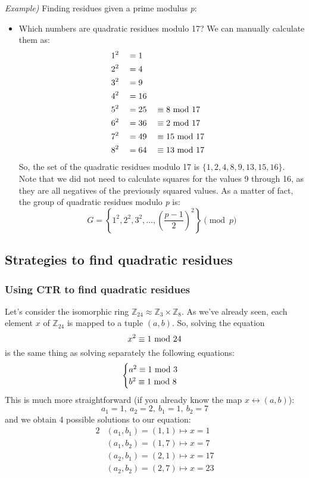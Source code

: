 \textit{Example)} Finding residues given a prime modulus \textit{p}:
\begin{itemize}
    \item[] Which numbers are quadratic residues modulo 17?
    We can manually calculate them as:
    \begin{alignat*}{3}
        &1^2&&=1\\
        &2^2&&=4\\
        &3^2&&=9\\
        &4^2&&=16\\
        &5^2&&=25&&\equiv8\text{ mod }17\\
        &6^2&&=36&&\equiv2\text{ mod }17\\
        &7^2&&=49&&\equiv15\text{ mod }17\\
        &8^2&&=64&&\equiv13\text{ mod }17
    \end{alignat*}
    So, the set of the quadratic residues modulo 17 is $\{1,2,4,8,9,13,15,16\}$. Note that we did not need to calculate squares for the values 9 through 16, as they are all negatives of the previously squared values. As a matter of fact, the group of quadratic residues modulo \textit{p} is:
    $$G = \left\{1^2, 2^2, 3^2, ..., \left(\frac{p-1}{2}\right)^2\right\}\pmod{p}$$
\end{itemize}

\newpage
\subsection{Strategies to find quadratic residues}
\subsubsection{Using CTR to find quadratic residues}
Let's consider the isomorphic ring $\mathbb{Z}_{24}\approx\mathbb{Z}_3\times\mathbb{Z}_8$. As we've already seen, each element $x$ of $\mathbb{Z}_{24}$ is mapped to a tuple $(a,b)$. So, solving the equation
$$x^2\equiv1\text{ mod }24$$
is the same thing as solving separately the following equations:
\begin{equation*}
    \begin{cases}
        a^2\equiv1\text{ mod }3\\
        b^2\equiv1\text{ mod }8
    \end{cases}
\end{equation*}
This is much more straightforward (if you already know the map $x\leftrightarrow(a,b)$):
$$a_1=1,\ a_2=2,\ b_1=1,\ b_2=7$$
and we obtain 4 possible solutions to our equation:
\begin{alignat*}{2}
    &(a_1,b_1)=(1,1)\mapsto x=1\\
    &(a_1,b_2)=(1,7)\mapsto x=7\\
    &(a_2,b_1)=(2,1)\mapsto x=17\\
    &(a_2,b_2)=(2,7)\mapsto x=23
\end{alignat*}

